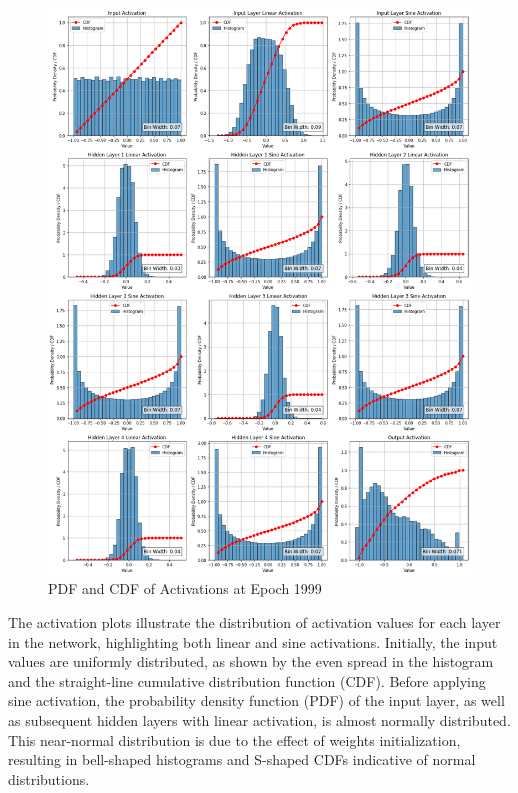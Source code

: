 \documentclass{ioereport}
\begin{document}
        \begin{figure}[H]
        \centering
        \includegraphics[width=\linewidth]{assets/video histogram/epoch1999activations.png}
        \caption{PDF and CDF of Activations at Epoch 1999}
        \label{fig:video-activation-1999}
    \end{figure}


    The activation plots illustrate the distribution of activation values for each layer in the network, highlighting both linear and sine activations. Initially, the input values are uniformly distributed, as shown by the even spread in the histogram and the straight-line cumulative distribution function (CDF). Before applying sine activation, the probability density function (PDF) of the input layer, as well as subsequent hidden layers with linear activation, is almost normally distributed. This near-normal distribution is due to the effect of weights initialization, resulting in bell-shaped histograms and S-shaped CDFs indicative of normal distributions.
\end{document}
